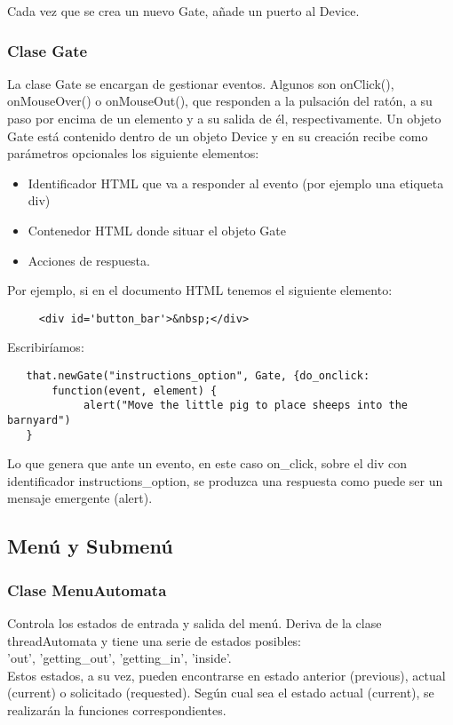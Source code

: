 Cada vez que se crea un nuevo Gate, añade un puerto al Device.

\subsubsection{Clase Gate}
\label{subsubsection:gate}
 
La clase Gate se encargan de gestionar eventos. Algunos son onClick(), onMouseOver() o onMouseOut(), que responden a la pulsación del ratón, a su paso por encima de un elemento y a su salida de él, respectivamente. 
Un objeto Gate está contenido dentro de un objeto Device y en su creación recibe como parámetros opcionales los siguiente elementos:

\begin{itemize}
 \item Identificador HTML que va a responder al evento (por ejemplo una etiqueta div) 
 \item Contenedor HTML donde situar el objeto Gate
 \item Acciones de respuesta.
\end{itemize}

Por ejemplo, si en el documento HTML tenemos el siguiente elemento:
\begin{verbatim}
     <div id='button_bar'>&nbsp;</div>
\end{verbatim}
Escribiríamos:
\begin{verbatim}
   that.newGate("instructions_option", Gate, {do_onclick: 
       function(event, element) {
            alert("Move the little pig to place sheeps into the barnyard")
   }
\end{verbatim}

Lo que genera que ante un evento, en este caso on\_click, sobre el div con identificador instructions\_option, se produzca  una respuesta como puede ser 
un mensaje emergente (alert).



\subsection{Menú y Submenú}
\label{subsection:menu}

\subsubsection{Clase MenuAutomata}
\label{subsubsection:menu_automata}

Controla los estados de entrada y salida del menú. Deriva de la clase threadAutomata y tiene una serie de estados posibles:\\
'out', 'getting\_out', 'getting\_in', 'inside'.\\
Estos estados, a su vez, pueden encontrarse en estado anterior (previous), actual (current) o solicitado (requested). Según cual sea  el estado 
actual (current), se realizarán la funciones correspondientes.\\

